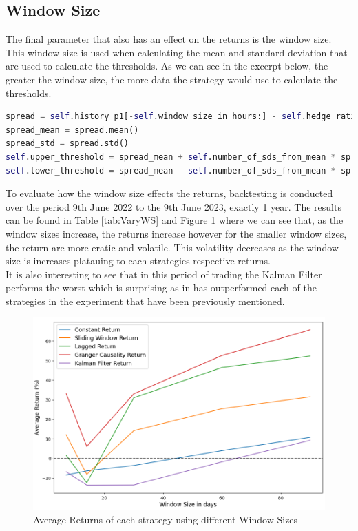 \subsection{Window Size}
The final parameter that also has an effect on the returns is the window size. This window size is used when calculating the mean and standard deviation that are used to calculate the thresholds. As we can see in the excerpt below, the greater the window size, the more data the strategy would use to calculate the thresholds.
\vspace{5mm}
\begin{lstlisting}[language=Python]
spread = self.history_p1[-self.window_size_in_hours:] - self.hedge_ratio * self.history_p2[-self.window_size_in_hours:]
spread_mean = spread.mean()
spread_std = spread.std()
self.upper_threshold = spread_mean + self.number_of_sds_from_mean * spread_std
self.lower_threshold = spread_mean - self.number_of_sds_from_mean * spread_std
\end{lstlisting}
\vspace{5mm}
To evaluate how the window size effects the returns, backtesting is conducted over the period 9th June 2022 to the 9th June 2023, exactly 1 year. The results can be found in Table \ref{tab:VaryWS} and Figure \ref{fig:VaryWS} where we can see that, as the window sizes increase, the returns increase however for the smaller window sizes, the return are more eratic and volatile. This volatility decreases as the window size is increases platauing to each strategies respective returns.
\\[3mm]
It is also interesting to see that in this period of trading the Kalman Filter performs the worst which is surprising as in has outperformed each of the strategies in the experiment that have been previously mentioned.

\begin{figure}[H]
    \centering
    \includegraphics[width=\linewidth]{evaluation/Images/VarWS.png}
    \caption{Average Returns of each strategy using different Window Sizes}
    \label{fig:VaryWS}
\end{figure}


